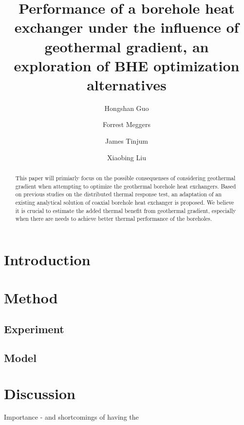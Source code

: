 \documentclass[3p]{elsarticle/elsarticle}
\begin{document}
\begin{frontmatter}
\title{Performance of a borehole heat exchanger under the influence of geothermal gradient, an exploration of BHE optimization alternatives}
\author[Group1]{Hongshan Guo}



\author[Group2]{Forrest Meggers}


\author[Group3]{James Tinjum}
\author[Group4]{Xiaobing Liu}

\address[Group1]{Andlinger Center for Energy and the Environment, Princeton University, Princeton, United States}
\address[Group2]{School of Architecture, Princeton University, Princeton, United States}



\begin{abstract}
This paper will primiarly focus on the possible consequenses of considering geothermal gradient when attempting to optimize the geothermal borehole heat exchangers. Based on previous studies on the distributed thermal response test, an adaptation of an existing analytical solution of coaxial borehole heat exchanger is proposed. We believe it is crucial to estimate the added thermal benefit from geothermal gradient, especially when there are needs to achieve better thermal performance of the boreholes.\end{abstract}

\begin{keyword}

\end{keyword}

\end{frontmatter}

\section{Introduction}

\section{Method}
	\subsection{Experiment}
	
	\subsection{Model}
	
\section{Discussion}
Importance - and shortcomings of having the 

\renewcommand\refname{References}

\end{document}
